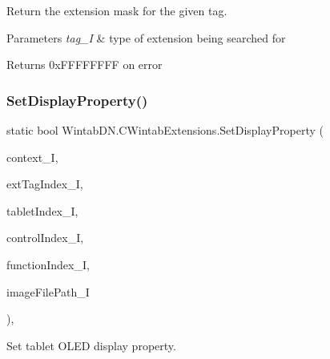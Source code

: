 Return the extension mask for the given tag. 


\begin{DoxyParams}{Parameters}
{\em tag\+\_\+I} & type of extension being searched for\\
\hline
\end{DoxyParams}
\begin{DoxyReturn}{Returns}
0x\+F\+F\+F\+F\+F\+F\+FF on error
\end{DoxyReturn}
\mbox{\label{class_wintab_d_n_1_1_c_wintab_extensions_ad35998f82be4c5ff67e3c476d89bcbdb}} 
\subsubsection{\texorpdfstring{Set\+Display\+Property()}{SetDisplayProperty()}}
{\footnotesize\ttfamily static bool Wintab\+D\+N.\+C\+Wintab\+Extensions.\+Set\+Display\+Property (\begin{DoxyParamCaption}\item[{\mbox{\hyperlink{class_wintab_d_n_1_1_c_wintab_context}{C\+Wintab\+Context}}}]{context\+\_\+I,  }\item[{\mbox{\hyperlink{namespace_wintab_d_n_a303ef868b8887dc43872ddac8a7d059b}{E\+W\+T\+X\+Extension\+Tag}}}]{ext\+Tag\+Index\+\_\+I,  }\item[{U\+Int32}]{tablet\+Index\+\_\+I,  }\item[{U\+Int32}]{control\+Index\+\_\+I,  }\item[{U\+Int32}]{function\+Index\+\_\+I,  }\item[{String}]{image\+File\+Path\+\_\+I }\end{DoxyParamCaption})\hspace{0.3cm}{\ttfamily [inline]}, {\ttfamily [static]}}



Set tablet O\+L\+ED display property. 


